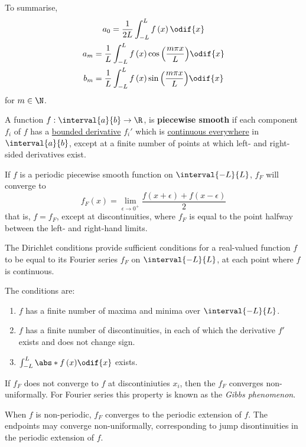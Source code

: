 \documentclass{article}
\begin{document}
To summarise,
\begin{gather*}
    a_0 = \frac{1}{2L} \int_{-L}^L f\left( x \right) \odif{x} \\
    a_m = \frac{1}{L} \int_{-L}^L f\left( x \right) \cos{\left( \frac{m \pi x}{L} \right)} \odif{x} \\
    b_m = \frac{1}{L} \int_{-L}^L f\left( x \right) \sin{\left( \frac{m \pi x}{L} \right)} \odif{x} 
\end{gather*}
for \(m \in \N\).
\begin{definition}
    A function \(f : \interval{a}{b} \to \R\), is \textbf{piecewise smooth} if each component \(f_i\) of \(f\) has a \underline{bounded derivative} \(f_i'\) which is \underline{continuous everywhere} in \(\interval{a}{b}\), except at
    a finite number of points at which left- and right-sided derivatives exist.
\end{definition}
\begin{theorem}
    If \(f\) is a periodic piecewise smooth function on \(\interval{-L}{L}\), \(f_F\) will converge to
    \begin{equation*}
        f_F\left( x \right) = \lim_{\epsilon \to 0^{+}} \frac{f\left( x + \epsilon \right) + f\left( x - \epsilon \right)}{2}
    \end{equation*}
    that is, \(f = f_F\), except at discontinuities, where \(f_F\) is equal to the point halfway between the left- and right-hand limits.
\end{theorem}
\begin{corollary}
    The Dirichlet conditions provide sufficient conditions for a real-valued function \(f\) to be
    equal to its Fourier series \(f_F\) on \(\interval{-L}{L}\), at each point where \(f\) is continuous.

    The conditions are:
    \begin{enumerate}
        \item \(f\) has a finite number of maxima and minima over \(\interval{-L}{L}\).
        \item \(f\) has a finite number of discontinuities, in each of which the derivative \(f'\) exists
        and does not change sign.
        \item \(\int_{-L}^L \abs*{f\left( x \right)} \odif{x}\) exists.
    \end{enumerate}
\end{corollary}
\begin{definition}
    If \(f_F\) does not converge to \(f\) at discontiniuties \(x_i\), then the \(f_F\) converges 
    non-uniformally. For Fourier series this property is known as the \textit{Gibbs phenomenon}.
\end{definition}
\begin{note}
    When \(f\) is non-periodic, \(f_F\) converges to the periodic extension of \(f\).
    The endpoints may converge non-uniformally, corresponding to jump disontinuities in the periodic extension of \(f\).
\end{note}
\end{document}
